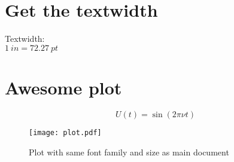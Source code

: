 \documentclass{scrartcl}
\begin{document}
  \section{Get the textwidth}
  Textwidth: \the\textwidth \\
  $\SI{1}{in} = \SI{72.27}{pt}$ 

  \section{Awesome plot}
  
  \blindtext

  \begin{equation}
    U(t) = \sin(2 \pi \nu t)
  \end{equation}

  \begin{figure}[htbp]
    \centering
    \texttt{[image: plot.pdf]}
    \caption{%
      Plot with same font family and size as main document
    }\label{fig:plot}
  \end{figure}

  \blindtext
\end{document}
